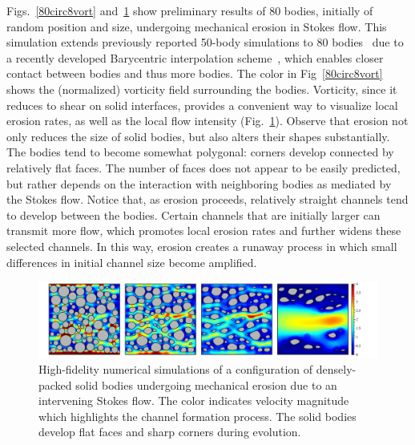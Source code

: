 \documentclass[11pt]{article}
\begin{document}
Figs.~\ref{80circ8vort} and~\ref{80circ8vel} show preliminary results of 80 bodies, initially of random position and size, undergoing mechanical erosion in Stokes flow. This simulation extends previously reported 50-body simulations to 80 bodies~\cite{Quaife2018} due to a recently developed Barycentric interpolation scheme~\cite{bar2014, bar-wu-vee2015, chi-moo-qua2019}, which enables closer contact between bodies and thus more bodies. The color in Fig~\ref{80circ8vort} shows the (normalized) vorticity field surrounding the bodies. Vorticity, since it reduces to shear on solid interfaces, provides a convenient way to visualize local erosion rates, as well as the local flow intensity (Fig.~\ref{80circ8vel}).  Observe that erosion not only reduces the size of solid bodies, but also alters their shapes substantially. The bodies tend to become somewhat polygonal: corners develop connected by relatively flat faces. The number of faces does not appear to be easily predicted, but rather depends on the interaction with neighboring bodies as mediated by the Stokes flow. Notice that, as erosion proceeds, relatively straight channels tend to develop between the bodies. Certain channels that are initially larger can transmit more flow, which promotes local erosion rates and further widens these selected channels. In this way, erosion creates a runaway process in which small differences in initial channel size become amplified.
 

\begin{figure}[htp]
\begin{center}
\includegraphics[width = 0.99 \textwidth]{./figs/80circ8vel.pdf}
\caption{\label{80circ8vel} High-fidelity numerical simulations of a configuration of densely-packed solid bodies undergoing mechanical erosion due to an intervening Stokes flow. The color indicates velocity magnitude which highlights the channel formation process. The solid bodies develop flat faces and sharp corners during evolution. }
\end{center}
\end{figure}
\end{document}
